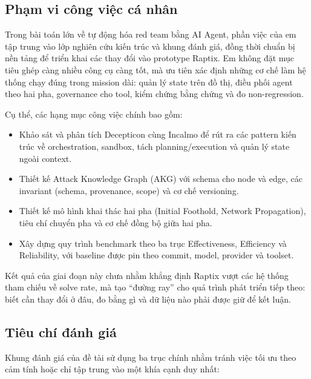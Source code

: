 \subsection{Phạm vi công việc cá nhân}
\label{sec:pham-vi-cong-viec-ca-nhan}

Trong bài toán lớn về tự động hóa red team bằng AI Agent, phần việc của em tập trung vào lớp nghiên cứu kiến trúc và khung đánh giá, đồng thời chuẩn bị nền tảng để triển khai các thay đổi vào prototype Raptix. Em không đặt mục tiêu ghép càng nhiều công cụ càng tốt, mà ưu tiên xác định những cơ chế làm hệ thống chạy đúng trong mission dài: quản lý state trên đồ thị, điều phối agent theo hai pha, governance cho tool, kiểm chứng bằng chứng và đo non-regression.

Cụ thể, các hạng mục công việc chính bao gồm:

\begin{itemize}
    \item Khảo sát và phân tích Decepticon cùng Incalmo để rút ra các pattern kiến trúc về orchestration, sandbox, tách planning/execution và quản lý state ngoài context.
    \item Thiết kế Attack Knowledge Graph (AKG) với schema cho node và edge, các invariant (schema, provenance, scope) và cơ chế versioning.
    \item Thiết kế mô hình khai thác hai pha (Initial Foothold, Network Propagation), tiêu chí chuyển pha và cơ chế đồng bộ giữa hai pha.
    \item Xây dựng quy trình benchmark theo ba trục Effectiveness, Efficiency và Reliability, với baseline được pin theo commit, model, provider và toolset.
\end{itemize}

Kết quả của giai đoạn này chưa nhằm khẳng định Raptix vượt các hệ thống tham chiếu về solve rate, mà tạo ``đường ray'' cho quá trình phát triển tiếp theo: biết cần thay đổi ở đâu, đo bằng gì và dữ liệu nào phải được giữ để kết luận.

\subsection{Tiêu chí đánh giá}
\label{sec:tieu-chi-danh-gia}

Khung đánh giá của đề tài sử dụng ba trục chính nhằm tránh việc tối ưu theo cảm tính hoặc chỉ tập trung vào một khía cạnh duy nhất:

